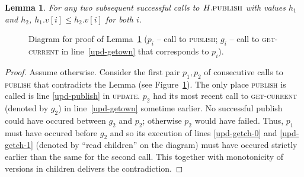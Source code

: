 \documentclass[a4paper,11pt]{article}
\newcommand{\atomic}[4]{\node(lab#1) at (#3,-#4+0.5) {#2};\draw (#3,-#4-0.1) to (lab#1);\node[inner sep=0pt](#1) at (#3,-#4) {};}
\newtheorem{lemma}{Lemma}
\newcommand{\fn}[1]{\textsc{#1}}
\begin{document}
\begin{lemma}
\label{lem-versions-increase}
For any two subsequent successful calls to $H.\fn{publish}$ with values $h_1$ and $h_2$, $h_1.v[i] \leq h_2.v[i]$ for both $i$.
\end{lemma}
\begin{figure}[!h]
\caption{Diagram for proof of Lemma~\ref{lem-versions-increase} ($p_i$ -- call to \fn{publish}; $g_i$ -- call to \fn{get-current} in line~\ref{upd-getown} that corresponds to $p_i$).}
\label{fig-versions-increase}
\end{figure}
\begin{proof}
Assume otherwise. Consider the first pair $p_1, p_2$ of consecutive calls to \fn{publish} that contradicts the Lemma (see Figure~\ref{fig-versions-increase}). The only place \fn{publish} is called is line \ref{upd-publish}
in \fn{update}.
$p_2$ had its most recent call to \fn{get-current} (denoted by $g_2$) in line~\ref{upd-getown} sometime earlier. No successful publish could have occured between $g_2$ and $p_2$; otherwise $p_2$
would have failed.
Thus, $p_1$ must have occured before $g_2$ and so its execution of lines \ref{upd-getch-0} and \ref{upd-getch-1} (denoted by ``read children'' on the diagram) must have occured strictly earlier than
the same for the second call. This together with monotonicity of versions in children delivers the contradiction.
\end{proof}
\end{document}
